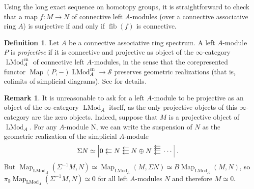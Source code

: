 \documentclass[12pt]{article}
\theoremstyle{definition}
\newtheorem{definition}{Definition}[subsection]
\newtheorem{remark}{Remark}[subsection]
\renewcommand{\S}{\mathcal{S}}
\DeclareMathOperator{\LMod}{LMod}
\DeclareMathOperator{\Map}{Map}
\DeclareMathOperator{\fib}{fib}
\newcommand{\cn}{\mathrm{cn}}
\def\llarrow{  \hspace{.05cm}\mbox{\,\put(0,-2){$\leftarrow$}\put(0,2){$\leftarrow$}\hspace{.45cm}}}
\def\lllarrow{ \hspace{.05cm}\mbox{\,\put(0,-3){$\leftarrow$}\put(0,1){$\leftarrow$}\put(0,5){$\leftarrow$}\hspace{.45cm}}}
\def\llllarrow{\hspace{.05cm}\mbox{\,\put(0,-3){$\leftarrow$}\put(0,.5){$\leftarrow$}\put(0,4){$\leftarrow$}\put(0,7.5){$\leftarrow$}
               \hspace{.45cm}}}
\begin{document}
Using the long exact sequence on homotopy groups, it is straightforward to check that a map $f:M\to N$ of connective left $A$-modules (over a connective associative ring $A$) is surjective if and only if $\fib(f)$ is connective.

\begin{definition}
Let $A$ be a connective associative ring spectrum. A left $A$-module $P$ is {\em projective} if it is connective and projective as object of the $\infty$-category $\LMod^{\cn}_A$ of connective left $A$-modules, in the sense that the corepresented functor $\Map(P,-)\LMod^{\cn}_A\to\S$ preserves geometric realizations (that is, colimits of simplicial diagrams). See \cite[Definition 5.5.8.18]{HTT} for details.
\end{definition}

\begin{remark}
It is unreasonable to ask for a left $A$-module to be projective as an object of the $\infty$-category $\LMod_A$ itself, as the only projective objects of this $\infty$-category are the zero objects.
Indeed, suppose that $M$ is a projective object of $\LMod_A$. For any $A$-module N, we can write the suspension of $N$ as the geometric realization of the simplicial $A$-module
\[
\Sigma N\simeq \left| 0\llarrow N\lllarrow N\oplus N\llllarrow\cdots\right|.
\]
But $
\Map_{\LMod_A}(\Sigma^{-1}M,N)\simeq\Map_{\LMod_A}(M,\Sigma N)\simeq
B\Map_{\LMod_A}(M,N)$,
so $\pi_0 \Map_{\LMod_A}(\Sigma^{-1} M, N)\simeq 0$ for all left $A$-modules $N$ and therefore $M\simeq 0$.
\end{remark}
\end{document}

